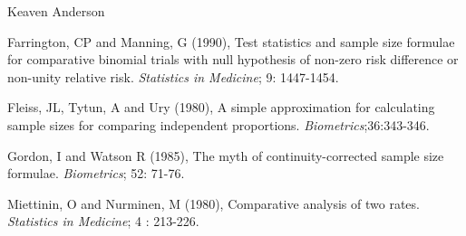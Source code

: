 \begin{Author}\relax
Keaven Anderson 
\end{Author}
\begin{References}\relax
Farrington, CP and Manning, G (1990), Test statistics and sample size formulae for comparative binomial trials with null hypothesis
of non-zero risk difference or non-unity relative risk. \emph{Statistics in Medicine}; 9: 1447-1454.

Fleiss, JL, Tytun, A and Ury (1980), A simple approximation for calculating sample sizes for comparing independent proportions.
\emph{Biometrics};36:343-346.

Gordon, I and Watson R (1985), The myth of continuity-corrected sample size formulae. \emph{Biometrics}; 52: 71-76.

Miettinin, O and Nurminen, M (1980), Comparative analysis of two rates. \emph{Statistics in Medicine}; 4 : 213-226.
\end{References}
